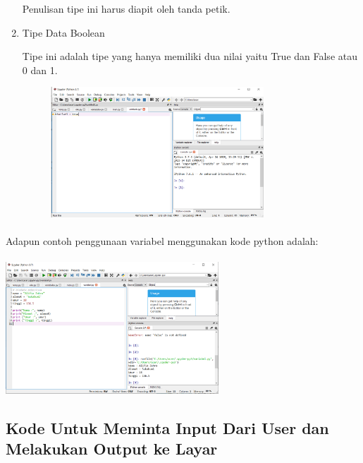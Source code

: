 \begin{enumerate}
\begin{enumerate}
\begin{figure}[h]
                \end{figure}
            \end{enumerate}
            \par Penulisan tipe ini harus diapit oleh tanda petik.
        \item Tipe Data Boolean
        \par Tipe ini adalah tipe yang hanya memiliki dua nilai yaitu True dan False atau 0 dan 1.
        \begin{figure}[h]
                 \centerline{\includegraphics[width=8cm]{figures/tipedataboolean.PNG}}
        \end{figure}
    \end{enumerate}
\paragraph{} Adapun contoh penggunaan variabel menggunakan kode python adalah:
\paragraph{}
            \centerline{\includegraphics[width=8cm]{figures/variabel.PNG}}


\subsection{Kode Untuk Meminta Input Dari User dan Melakukan Output ke Layar}

